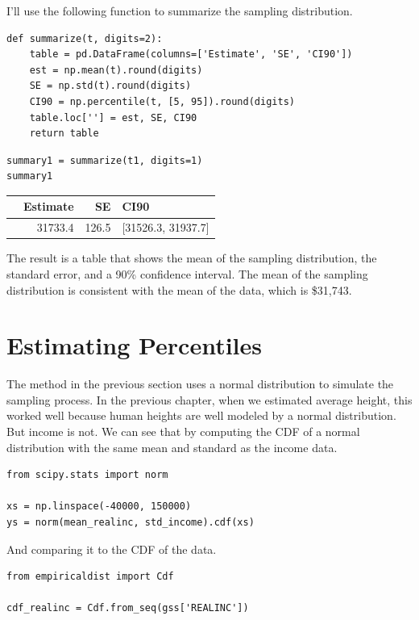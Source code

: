I'll use the following function to summarize the sampling distribution.

\begin{lstlisting}[]
def summarize(t, digits=2):
    table = pd.DataFrame(columns=['Estimate', 'SE', 'CI90'])
    est = np.mean(t).round(digits)
    SE = np.std(t).round(digits)
    CI90 = np.percentile(t, [5, 95]).round(digits)
    table.loc[''] = est, SE, CI90
    return table
\end{lstlisting}

\begin{lstlisting}[]
summary1 = summarize(t1, digits=1)
summary1
\end{lstlisting}

\begin{tabular}{lrrl}
\midrule
{} &  Estimate &     SE &                CI90 \\
\midrule
{} &   31733.4 &  126.5 &  [31526.3, 31937.7] \\
\midrule
\end{tabular}

The result is a table that shows the mean of the sampling distribution,
the standard error, and a 90\% confidence interval. The mean of the
sampling distribution is consistent with the mean of the data, which is
\$31,743.

\hypertarget{estimating-percentiles}{%
\section{Estimating Percentiles}\label{estimating-percentiles}}

The method in the previous section uses a normal distribution to
simulate the sampling process. In the previous chapter, when we
estimated average height, this worked well because human heights are
well modeled by a normal distribution. But income is not. We can see
that by computing the CDF of a normal distribution with the same mean
and standard as the income data.

\begin{lstlisting}[]
from scipy.stats import norm

xs = np.linspace(-40000, 150000)
ys = norm(mean_realinc, std_income).cdf(xs)
\end{lstlisting}

And comparing it to the CDF of the data.

\begin{lstlisting}[]
from empiricaldist import Cdf

cdf_realinc = Cdf.from_seq(gss['REALINC'])
\end{lstlisting}

